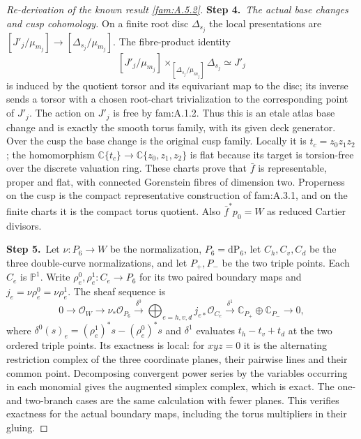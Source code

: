 \begin{proof}[Re-derivation of the known result \ref{fam:A.5.2}]
\par\smallskip\noindent\textbf{Step 4.}\ \emph{The actual base changes and cusp cohomology.}
On a finite root disc $\Delta_{s_j}$ the local presentations are
$[J'_j/\mu_{m_j}]\to[\Delta_{s_j}/\mu_{m_j}]$.
The fibre-product identity
\[
 [J'_j/\mu_{m_j}]
 \mathbin{\times_{[\Delta_{s_j}/\mu_{m_j}]}}\Delta_{s_j}
 \simeq J'_j
\]
is induced by the quotient torsor and its equivariant map to the disc;
its inverse sends a torsor with a chosen root-chart trivialization to
the corresponding point of $J'_j$. The action on $J'_j$ is free by
fam:A.1.2. Thus this is an etale atlas base change and is exactly the
smooth torus family, with its given deck generator. Over the cusp the
base change is the original cusp family. Locally it is
$t_c=z_0z_1z_2$; the homomorphism
$\mathbb C\{t_c\}\to\mathbb C\{z_0,z_1,z_2\}$ is flat because its
target is torsion-free over the discrete valuation ring.
These charts prove that $\bar f$ is representable, proper and flat,
with connected Gorenstein fibres of dimension two. Properness on the
cusp is the compact representative construction of fam:A.3.1, and on the
finite charts it is the compact torus quotient. Also
$\bar f^*p_0=W$ as reduced Cartier divisors.

\par\smallskip\noindent\textbf{Step 5.}\ Let $\nu:P_6\to W$ be the normalization, $P_6=\mathrm{dP}_6$, let
$C_h,C_v,C_d$ be the three double-curve normalizations, and let
$P_+,P_-$ be the two triple points. Each $C_e$ is $\mathbb P^1$.
Write $\rho_e^0,\rho_e^1:C_e\to P_6$ for its two paired boundary maps
and $j_e=\nu\rho_e^0=\nu\rho_e^1$. The sheaf sequence is
\begin{equation}\label{fam:eq:ab-cusp-resolution}
 0\longrightarrow\mathcal O_W\longrightarrow\nu_*\mathcal O_{P_6}
 \xrightarrow{\delta^0}\bigoplus_{e=h,v,d}j_{e*}\mathcal O_{C_e}
 \xrightarrow{\delta^1}\mathbb C_{P_+}\oplus\mathbb C_{P_-}
 \longrightarrow0,
\end{equation}
where $\delta^0(s)_e=(\rho_e^1)^*s-(\rho_e^0)^*s$ and
$\delta^1$ evaluates $t_h-t_v+t_d$ at the two ordered triple points.
Its exactness is local: for $xyz=0$ it is the alternating restriction
complex of the three coordinate planes, their pairwise lines and their
common point. Decomposing convergent power series by the variables
occurring in each monomial gives the augmented simplex complex, which
is exact. The one- and two-branch cases are the same calculation with
fewer planes. This verifies exactness for the actual boundary maps,
including the torus multipliers in their gluing.


\end{proof}
